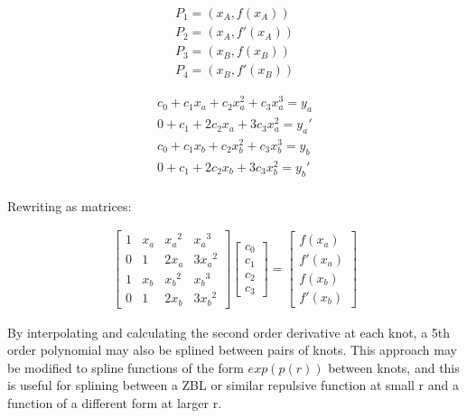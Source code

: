 \begin{equation}
\begin{split}
      P_{1} = \left( x_A, f(x_A) \right) \\
      P_{2} = \left( x_A, f'(x_A) \right) \\
      P_{3} = \left( x_B, f(x_B) \right) \\
      P_{4} = \left( x_B, f'(x_B) \right)
\end{split}
\label{eq:eqSplineThreePoints}
\end{equation}

\begin{equation}
\begin{split}
c_0 + c_1 x_a + c_2 x_a^2 + c_3 x_a^3 = y_a \\
0 + c_1 + 2 c_2 x_a + 3 c_3 x_a^2 = y_a' \\
c_0 + c_1 x_b + c_2 x_b^2 + c_3 x_b^3 = y_b \\
0 + c_1 + 2 c_2 x_b + 3 c_3 x_b^2 = y_b' \\
\end{split}
\label{eq:cubicSpline}
\end{equation}

Rewriting as matrices:

\begin{equation}
\begin{split}
      \begin{bmatrix}
      1  &  x_a  &  {x_a}^2  &  {x_a}^3     \\
      0  &  1    &  2 x_a    &  3 {x_a}^2   \\
      1  &  x_b  &  {x_b}^2  &  {x_b}^3     \\
      0  &  1    &  2 x_b    &  3 {x_b}^2
      \end{bmatrix}
      \begin{bmatrix}
      c_0 \\
      c_1 \\ 
      c_2 \\ 
      c_3
      \end{bmatrix}
      = 
      \begin{bmatrix}
      f(x_a) \\
      f'(x_a) \\ 
      f(x_b) \\ 
      f'(x_b)
      \end{bmatrix}
\end{split}
\label{eq:eqSplineThreeMatrix}
\end{equation}

By interpolating and calculating the second order derivative at each knot, a 5th order polynomial may also be splined between pairs of knots.  This approach may be modified to spline functions of the form $exp(p(r))$ between knots, and this is useful for splining between a ZBL or similar repulsive function at small r and a function of a different form at larger r.


